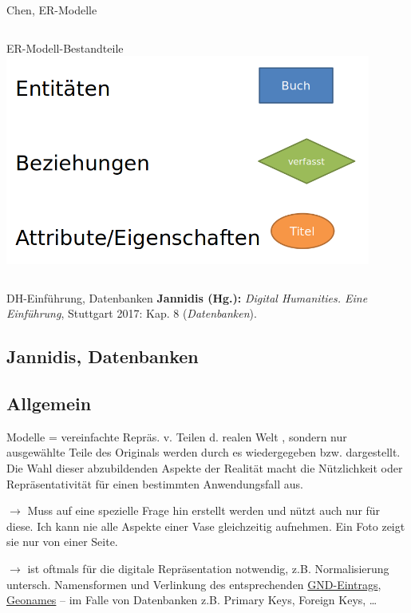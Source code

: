 \begin{frame}{Chen, ER-Modelle}
\begin{columns}[T,onlytextwidth]
      \begin{block}{ER-Modell-Bestandteile}
      \includegraphics[width=0.9\textwidth]{img/er-bsp2.png}
      \end{block}
  \end{columns}

\end{frame}

\begin{frame}{DH-Einführung, Datenbanken}
\textbf{Jannidis (Hg.):} \emph{Digital Humanities. Eine Einführung}, Stuttgart 2017: Kap. 8 (\emph{Datenbanken}).
\subsection{Jannidis, Datenbanken}
\end{frame}


\subsection{Allgemein}
\begin{frame}{Modelle = vereinfachte Repräs. v. Teilen d. realen Welt}
, sondern nur ausgewählte Teile des Originals werden durch es wiedergegeben bzw. dargestellt. Die Wahl dieser abzubildenden Aspekte der Realität macht die Nützlichkeit oder Repräsentativität für einen bestimmten Anwendungsfall aus.

 $\to$ Muss auf eine spezielle Frage hin erstellt werden und nützt auch nur für diese. Ich kann nie alle Aspekte einer Vase gleichzeitig aufnehmen. Ein Foto zeigt sie nur von einer Seite.

 $\to$ ist oftmals für die digitale Repräsentation notwendig, z.B. Normalisierung untersch. Namensformen und Verlinkung des entsprechenden \href{http://d-nb.info/gnd/119287064}{GND-Eintrags}, \href{https://www.geonames.org}{Geonames} -- im Falle von Datenbanken z.B. Primary Keys, Foreign Keys, \dots

\end{frame}



